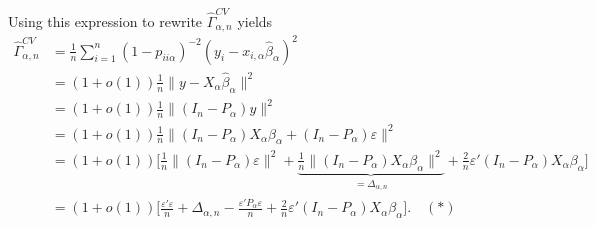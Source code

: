 \documentclass[Research_Module_ES.tex]{subfiles}
\begin{document}
Using this expression to rewrite $\hat{\Gamma}_{\alpha,n}^{CV}$ yields
\begin{align*}
\hat{\Gamma}_{\alpha,n}^{CV} &= \frac{1}{n}\sum_{i=1}^n (1- p_{ii\alpha})^{-2}(y_i-x_{i,\alpha}\hat{\beta}_\alpha)^2\\
&= (1+o(1))\frac{1}{n}\lVert y-X_{\alpha}\hat{\beta}_\alpha\rVert^2\\
&= (1+o(1))\frac{1}{n}\lVert (I_n-P_\alpha) y\rVert^2\\
&= (1+o(1))\frac{1}{n}\lVert (I_n-P_\alpha) X_\alpha\beta_\alpha +(I_n-P_\alpha)\varepsilon \rVert^2\\
&= (1+o(1))\biggl[\frac{1}{n}\lVert(I_n-P_\alpha)\varepsilon \rVert^2+ \underbrace{\frac{1}{n}\lVert (I_n-P_\alpha) X_\alpha\beta_\alpha\rVert^2}_{=\Delta_{\alpha,n}} +\frac{2}{n}\varepsilon'(I_n-P_\alpha) X_\alpha\beta_\alpha\biggr]\\
&= (1+o(1)) \biggl[\frac{\varepsilon'\varepsilon}{n} + \Delta_{\alpha,n} - \frac{\varepsilon'P_\alpha\varepsilon}{n} +\frac{2}{n}\varepsilon'(I_n-P_\alpha) X_\alpha\beta_\alpha\biggr]. \quad (\ast)
\end{align*}
\end{document}

